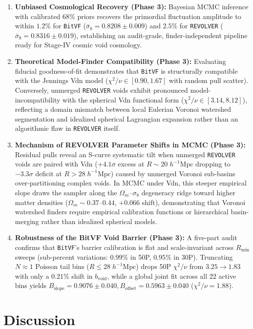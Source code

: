 \documentclass[12pt]{report}
\begin{document}
\begin{enumerate}
    \item \textbf{Unbiased Cosmological Recovery (Phase 3):} Bayesian MCMC inference with calibrated 68\% priors recovers the primordial fluctuation amplitude to within $1.2\%$ for \texttt{BitVF} ($\bar{\sigma}_8 = 0.8208 \pm 0.009$) and $2.5\%$ for \texttt{REVOLVER} ($\bar{\sigma}_8 = 0.8316 \pm 0.019$), establishing an audit-grade, finder-independent pipeline ready for Stage-IV cosmic void cosmology.
    \item \textbf{Theoretical Model-Finder Compatibility (Phase 3):} Evaluating fiducial goodness-of-fit demonstrates that \texttt{BitVF} is structurally compatible with the Jennings Vdn model ($\chi^2/\nu \in [0.90, 1.67]$ with random pull scatter). Conversely, unmerged \texttt{REVOLVER} voids exhibit pronounced model-incompatibility with the spherical Vdn functional form ($\chi^2/\nu \in [3.14, 8.12]$), reflecting a domain mismatch between local Eulerian Voronoi watershed segmentation and idealized spherical Lagrangian expansion rather than an algorithmic flaw in \texttt{REVOLVER} itself.
    \item \textbf{Mechanism of REVOLVER Parameter Shifts in MCMC (Phase 3):} Residual pulls reveal an S-curve systematic tilt when unmerged \texttt{REVOLVER} voids are paired with Vdn ($+4.1\sigma$ excess at $R \sim 20\;h^{-1}\mathrm{Mpc}$ dropping to $-3.3\sigma$ deficit at $R > 28\;h^{-1}\mathrm{Mpc}$) caused by unmerged Voronoi sub-basins over-partitioning complex voids. In MCMC under Vdn, this steeper empirical slope draws the sampler along the $\Omega_m$--$\sigma_8$ degeneracy ridge toward higher matter densities ($\Omega_m \sim 0.37$--$0.44$, $+0.066$ shift), demonstrating that Voronoi watershed finders require empirical calibration functions or hierarchical basin-merging rather than idealized spherical models.
    \item \textbf{Robustness of the BitVF Void Barrier (Phase 3):} A five-part audit confirms that \texttt{BitVF}'s barrier calibration is flat and scale-invariant across $R_{\mathrm{min}}$ sweeps (sub-percent variations: $0.99\%$ in 50P, $0.95\%$ in 30P). Truncating $N \approx 1$ Poisson tail bins ($R \le 28\;h^{-1}\mathrm{Mpc}$) drops 50P $\chi^2/\nu$ from $3.25 \rightarrow 1.83$ with only a $0.21\%$ shift in $b_{\mathrm{void}}$, while a global joint fit across all 22 active bins yields $B_{\mathrm{slope}} = 0.9076 \pm 0.040, B_{\mathrm{offset}} = 0.5963 \pm 0.040$ ($\chi^2/\nu = 1.88$).
\end{enumerate}

\chapter{Discussion}
\label{chap:discussion}
\end{document}
